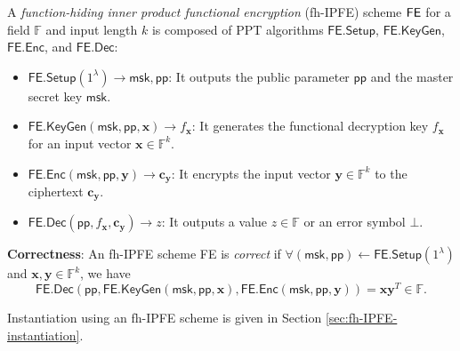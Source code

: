 \begin{definition}
\label{def:fh-IPFE}
	A \emph{function-hiding inner product functional encryption} (fh-IPFE) scheme $\sf FE$ for a field $\mathbb{F}$ and input length $k$ is composed of PPT algorithms $\textsf{FE.Setup}$, $\textsf{FE.KeyGen}$, $\textsf{FE.Enc}$, and $\textsf{FE.Dec}$:

	\begin{itemize}
	
		\item $\textsf{FE.Setup}(1^\lambda) \to \textsf{msk}, \textsf{pp}$: It outputs the public parameter $\textsf{pp}$ and the master secret key $\textsf{msk}$.
	
		\item $\textsf{FE.KeyGen}(\textsf{msk}, \textsf{pp}, \mathbf{x}) \to f_\mathbf{x}$: It generates the functional decryption key $f_\mathbf{x}$ for an input vector $\mathbf{x} \in \mathbb{F}^k$. 
	
		\item $\textsf{FE.Enc}(\textsf{msk}, \textsf{pp}, \mathbf{y}) \to \mathbf{c_y}$: It encrypts the input vector $\mathbf{y} \in \mathbb{F}^k$ to the ciphertext $\mathbf{c_y}$. 
	
		\item $\textsf{FE.Dec}(\textsf{pp}, f_\mathbf{x}, \mathbf{c_y}) \to z$: It outputs a value $z \in \mathbb{F}$ or an error symbol $\bot$.
	
	\end{itemize}
	
	\noindent \textbf{Correctness}: An fh-IPFE scheme \textsf{FE} is \emph{correct} if $\forall (\textsf{msk}, \textsf{pp}) \gets \textsf{FE.Setup}(1^\lambda)$ and $ \mathbf{x}, \mathbf{y} \in \mathbb{F}^k$, we have
	\[
		\textsf{FE.Dec}( \textsf{pp}, \textsf{FE.KeyGen}(\textsf{msk}, \textsf{pp}, \mathbf{x}), \textsf{FE.Enc}(\textsf{msk}, \textsf{pp}, \mathbf{y}) ) = \mathbf{x} \mathbf{y}^T \in \mathbb{F}.
	\]

\end{definition}

Instantiation using an fh-IPFE scheme is given in Section \ref{sec:fh-IPFE-instantiation}.


